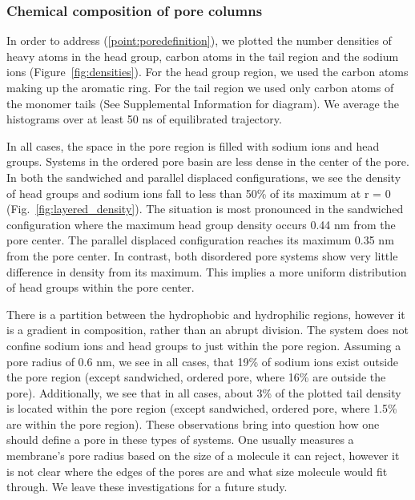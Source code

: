 \documentclass[journal=jpcbfk,manusciprt=article]{achemso}
\begin{document}
  \subsubsection{Chemical composition of pore columns}

  In order to address (\ref{point:poredefinition}), we plotted the number
  densities of heavy atoms in the head group, carbon atoms in the tail region
  and the sodium ions (Figure~\ref{fig:densities}). For the head group region,
  we used the carbon atoms making up the aromatic ring. For the tail region we
  used only carbon atoms of the monomer tails (See Supplemental Information for
  diagram). We average the histograms over at least 50 ns of equilibrated trajectory.

  In all cases, the space in the pore region is filled with sodium ions and
  head groups. Systems in the ordered pore basin are less dense in
  the center of the pore. In both the sandwiched and parallel displaced
  configurations, we see the density of head groups and sodium ions fall to less
  than 50\% of its maximum at r = 0 (Fig.~\ref{fig:layered_density}). The
  situation is most pronounced in the sandwiched configuration where the maximum
  head group density occurs 0.44 nm from the pore center. The parallel displaced
  configuration reaches its maximum 0.35 nm from the pore center. In contrast,
  both disordered pore systems show very little difference in density from its
  maximum. This implies a more uniform distribution of head groups within the
  pore center. 

  There is a partition between the hydrophobic and hydrophilic regions, however
  it is a gradient in composition, rather than an abrupt division. The system
  does not confine sodium ions and head groups to just within the pore region.
  Assuming a pore radius of 0.6 nm, we see in all cases, that 19\% of sodium ions
  exist outside the pore region (except sandwiched, ordered pore, where 16\%
  are outside the pore). Additionally, we see that in all cases, about 3\% of the
  plotted tail density is located within the pore region (except sandwiched,
  ordered pore, where 1.5\% are within the pore region). These observations bring
  into question how one should define a pore in these types of systems. One
  usually measures a membrane's pore radius based on the size of a molecule it
  can reject, however it is not clear where the edges of the pores are and what
  size molecule would fit through. We leave these investigations for a future
  study.
\end{document}
